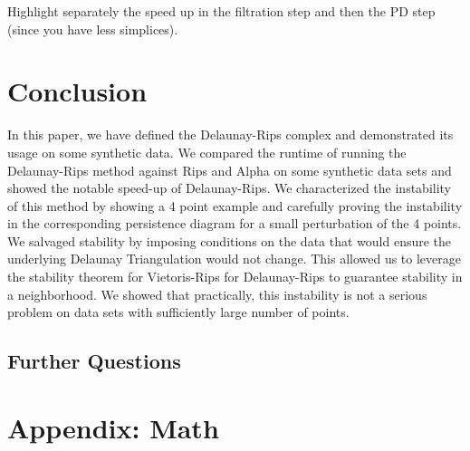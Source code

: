 \documentclass[letterpaper,titlepage]{article}
\begin{document}
    
    
    Highlight separately the speed up in the filtration step and then the PD step (since you have less simplices).

\section{Conclusion}
In this paper, we have defined the Delaunay-Rips complex and demonstrated its usage on some synthetic data. We compared the runtime of running the Delaunay-Rips method against Rips and Alpha on some synthetic data sets and showed the notable speed-up of Delaunay-Rips. We characterized the instability of this method by showing a 4 point example and carefully proving the instability in the corresponding persistence diagram for a small perturbation of the 4 points. We salvaged stability by imposing conditions on the data that would ensure the underlying Delaunay Triangulation would not change. This allowed us to leverage the stability theorem for Vietoris-Rips for Delaunay-Rips to guarantee stability in a neighborhood. We showed that practically, this instability is not a serious problem on data sets with sufficiently large number of points.


\subsection{Further Questions}


\appendix
\section{Appendix: Math}
\end{document}
